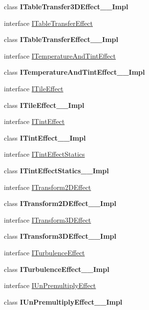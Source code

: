 \begin{DoxyCompactItemize}
\item 
class {\bfseries I\+Table\+Transfer3\+D\+Effect\+\_\+\+\_\+\+Impl}
\item 
interface \hyperlink{interface_microsoft_1_1_graphics_1_1_canvas_1_1_effects_1_1_i_table_transfer_effect}{I\+Table\+Transfer\+Effect}
\item 
class {\bfseries I\+Table\+Transfer\+Effect\+\_\+\+\_\+\+Impl}
\item 
interface \hyperlink{interface_microsoft_1_1_graphics_1_1_canvas_1_1_effects_1_1_i_temperature_and_tint_effect}{I\+Temperature\+And\+Tint\+Effect}
\item 
class {\bfseries I\+Temperature\+And\+Tint\+Effect\+\_\+\+\_\+\+Impl}
\item 
interface \hyperlink{interface_microsoft_1_1_graphics_1_1_canvas_1_1_effects_1_1_i_tile_effect}{I\+Tile\+Effect}
\item 
class {\bfseries I\+Tile\+Effect\+\_\+\+\_\+\+Impl}
\item 
interface \hyperlink{interface_microsoft_1_1_graphics_1_1_canvas_1_1_effects_1_1_i_tint_effect}{I\+Tint\+Effect}
\item 
class {\bfseries I\+Tint\+Effect\+\_\+\+\_\+\+Impl}
\item 
interface \hyperlink{interface_microsoft_1_1_graphics_1_1_canvas_1_1_effects_1_1_i_tint_effect_statics}{I\+Tint\+Effect\+Statics}
\item 
class {\bfseries I\+Tint\+Effect\+Statics\+\_\+\+\_\+\+Impl}
\item 
interface \hyperlink{interface_microsoft_1_1_graphics_1_1_canvas_1_1_effects_1_1_i_transform2_d_effect}{I\+Transform2\+D\+Effect}
\item 
class {\bfseries I\+Transform2\+D\+Effect\+\_\+\+\_\+\+Impl}
\item 
interface \hyperlink{interface_microsoft_1_1_graphics_1_1_canvas_1_1_effects_1_1_i_transform3_d_effect}{I\+Transform3\+D\+Effect}
\item 
class {\bfseries I\+Transform3\+D\+Effect\+\_\+\+\_\+\+Impl}
\item 
interface \hyperlink{interface_microsoft_1_1_graphics_1_1_canvas_1_1_effects_1_1_i_turbulence_effect}{I\+Turbulence\+Effect}
\item 
class {\bfseries I\+Turbulence\+Effect\+\_\+\+\_\+\+Impl}
\item 
interface \hyperlink{interface_microsoft_1_1_graphics_1_1_canvas_1_1_effects_1_1_i_un_premultiply_effect}{I\+Un\+Premultiply\+Effect}
\item 
class {\bfseries I\+Un\+Premultiply\+Effect\+\_\+\+\_\+\+Impl}

\end{DoxyCompactItemize}
